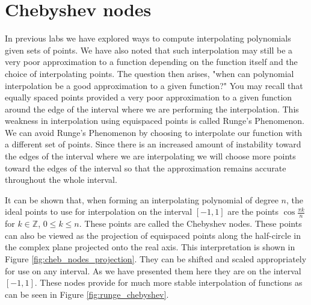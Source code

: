 \label{lab:cheb_interp}


\section*{Chebyshev nodes}

In previous labs we have explored ways to compute interpolating polynomials given sets of points.
We have also noted that such interpolation may still be a very poor approximation to a function depending on the function itself and the choice of interpolating points.
The question then arises, "when can polynomial interpolation be a good approximation to a given function?"
You may recall that equally spaced points provided a very poor approximation to a given function around the edge of the interval where we are performing the interpolation.
This weakness in interpolation using equispaced points is called Runge's Phenomenon.
We can avoid Runge's Phenomenon by choosing to interpolate our function with a different set of points.
Since there is an increased amount of instability toward the edges of the interval where we are interpolating we will choose more points toward the edges of the interval so that the approximation remains accurate throughout the whole interval.

It can be shown that, when forming an interpolating polynomial of degree $n$, the ideal points to use for interpolation on the interval $[-1, 1]$ are the points $\cos{\frac{\pi k}{n}}$ for $k\in\mathbb{Z}$, $0 \leq k \leq n$.
These points are called the Chebyshev nodes.
These points can also be viewed as the projection of equispaced points along the half-circle in the complex plane projected onto the real axis.
This interpretation is shown in Figure \ref{fig:cheb_nodes_projection}.
They can be shifted and scaled appropriately for use on any interval.
As we have presented them here they are on the interval $[-1, 1]$.
These nodes provide for much more stable interpolation of functions as can be seen in Figure \ref{fig:runge_chebyshev}.

